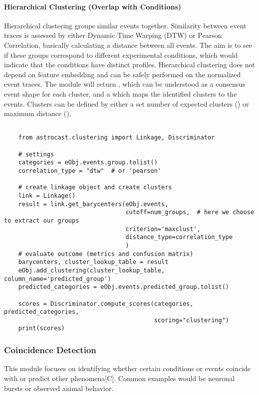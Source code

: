 \paragraph{Hierarchical Clustering (Overlap with Conditions)}
Hierarchical clustering groups similar events together. Similarity between event traces is assessed by either Dynamic Time Warping (DTW) or Pearson Correlation, basically calculating a distance between all events. The aim is to see if these groups correspond to different experimental conditions, which would indicate that the conditions have distinct profiles. Hierarchical clustering does not depend on feature embedding and can be safely performed on the normalized event traces. The  module will return , which can be understood as a consensus event shape for each cluster, and a  which maps the identified clusters to the events. Clusters can be defined by either a set number of expected clusters () or maximum distance ().

\begin{lstlisting}[style=pyStyle]

    from astrocast.clustering import Linkage, Discriminator

    # settings
    categories = eObj.events.group.tolist()
    correlation_type = "dtw"  # or 'pearson'

    # create linkage object and create clusters
    link = Linkage()
    result = link.get_barycenters(eObj.events,
                                  cutoff=num_groups,  # here we choose to extract our groups
                                  criterion='maxclust',
                                  distance_type=correlation_type
                                  )
    # evaluate outcome (metrics and confusion matrix)
    barycenters, cluster_lookup_table = result
    eObj.add_clustering(cluster_lookup_table, column_name='predicted_group')
    predicted_categories = eObj.events.predicted_group.tolist()

    scores = Discriminator.compute_scores(categories, predicted_categories,
                                          scoring="clustering")
    print(scores)

\end{lstlisting}

\subsubsection{Coincidence Detection}
This module focuses on identifying whether certain conditions or events coincide with or predict other phenomena[C]. Common examples would be neuronal bursts or observed animal behavior.

